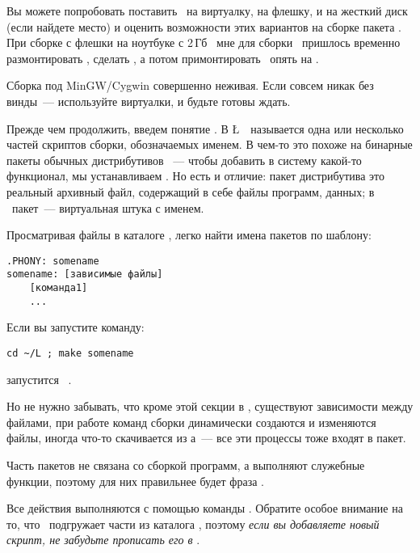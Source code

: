 Вы можете попробовать поставить \linux\ на виртуалку, на флешку, и на жесткий
диск (если найдете место) и оценить возможности этих вариантов на сборке пакета
. При сборке с флешки на ноутбуке с 2\,Гб \ram\ мне для сборки
\ пришлось временно размонтировать , сделать
, а потом примонтировать \
опять на .

Сборка под MinGW/Cygwin совершенно неживая. Если совсем никак без винды\ ---
используйте виртуалки, и будьте готовы ждать.



Прежде чем продолжить, введем понятие . В \L\
\ называется одна или несколько частей скриптов сборки,
обозначаемых именем. В чем-то это похоже на бинарные пакеты обычных
дистрибутивов \linux\ --- чтобы добавить в систему какой-то функционал, мы
устанавливаем \term{бинарный пакет}.
Но есть и отличие: пакет дистрибутива это реальный архивный файл, содержащий в
себе файлы программ, данных; в \al\ пакет\ --- виртуальная штука с именем.

Просматривая файлы в каталоге \file{mk/}, легко найти имена пакетов по шаблону:

\begin{verbatim}
.PHONY: somename
somename: [зависимые файлы]
    [команда1]
    ...
\end{verbatim}

Если вы запустите команду:

\begin{verbatim}
cd ~/L ; make somename
\end{verbatim}

запустится \ .

Но не нужно забывать, что кроме этой секции в \file{.mk}, существуют зависимости
между файлами, при работе команд сборки динамически создаются и изменяются
файлы, иногда что-то скачивается из \internet а\ --- все эти процессы тоже
входят в пакет.

\bigskip
Часть пакетов не связана со сборкой программ, а выполняют служебные функции,
поэтому для них правильнее будет фраза .

\bigskip
Все действия выполняются с помощью команды . Обратите особое внимание
на то, что \ подгружает части из каталога , поэтому
\emph{если вы добавляете новый скрипт, не забудьте прописать его в
\file{Makefile}}.

